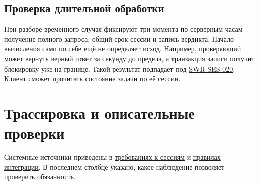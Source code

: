 \documentclass[12pt,a4paper]{article}
\begin{document}
\subsection{Проверка длительной обработки}\label{ux43fux440ux43eux432ux435ux440ux43aux430-ux434ux43bux438ux442ux435ux43bux44cux43dux43eux439-ux43eux431ux440ux430ux431ux43eux442ux43aux438}

\hypertarget{проверка-длительной-обработки}{}

При разборе временного случая фиксируют три момента по серверным часам --- получение полного запроса, общий срок сессии и запись вердикта. Начало вычисления само по себе ещё не определяет исход. Например, проверяющий может вернуть верный ответ за секунду до предела, а транзакция записи получит блокировку уже на границе. Такой результат подпадает под {\hyperlink{swr-ses-020}{SWR-SES-020}}. Клиент сможет прочитать состояние задачи по её сессии.

\section{Трассировка и описательные проверки}\label{6-ux442ux440ux430ux441ux441ux438ux440ux43eux432ux43aux430-ux438-ux43eux43fux438ux441ux430ux442ux435ux43bux44cux43dux44bux435-ux43fux440ux43eux432ux435ux440ux43aux438}

\hypertarget{6-трассировка-и-описательные-проверки}{}

Системные источники приведены в {\href{../04\_Системные\_требования/DOC-05\_Системные\_требования.pdf\#doc-05-требования-к-сессиям-задач}{требованиях к сессиям}} и {\href{../04\_Системные\_требования/DOC-05\_Системные\_требования.pdf\#doc-05-общесистемная-интеграция}{правилах интеграции}}. В последнем столбце указано, какое наблюдение позволяет проверить обязанность.
\end{document}
